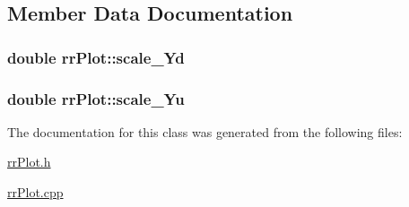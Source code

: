 \subsection{Member Data Documentation}
\hypertarget{classrr_plot_aa21b657663077f2bc1a43e630685906b}{
\subsubsection[{scale\+\_\+\+Yd}]{\setlength{\rightskip}{0pt plus 5cm}double rr\+Plot\+::scale\+\_\+\+Yd}}\label{classrr_plot_aa21b657663077f2bc1a43e630685906b}
\hypertarget{classrr_plot_a9c714381d88800087dea02cc188aed89}{
\subsubsection[{scale\+\_\+\+Yu}]{\setlength{\rightskip}{0pt plus 5cm}double rr\+Plot\+::scale\+\_\+\+Yu}}\label{classrr_plot_a9c714381d88800087dea02cc188aed89}


The documentation for this class was generated from the following files\+:\begin{DoxyCompactItemize}
\item 
\hyperlink{rr_plot_8h}{rr\+Plot.\+h}\item 
\hyperlink{rr_plot_8cpp}{rr\+Plot.\+cpp}\end{DoxyCompactItemize}
